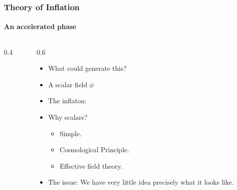 
\begin{frame}
  \frametitle{Theory of Inflation}
  \framesubtitle{An accelerated phase}
  \begin{columns}
    \begin{column}{0.4\textwidth}


    \end{column}
    \begin{column}{0.6\textwidth}

      \begin{itemize}
        \item<1-> What could generate this?
        \item<2-> A scalar field $\phi$ 
        \item<3-> The inflaton:
        \item<4-> Why scalars?
          \begin{itemize}
            \item<5-> Simple.
            \item<6-> Cosmological Principle.
            \item<7-> Effective field theory.
          \end{itemize}
        \item<8-> The issue: We have very little idea precisely what it looks like.
      \end{itemize}



    \end{column}
  \end{columns}

\end{frame}

